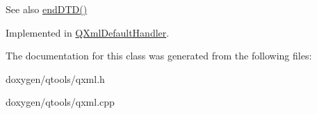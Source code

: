 \begin{DoxySeeAlso}{See also}
\mbox{\hyperlink{class_q_xml_lexical_handler_a7f5188d7a0a54b6c276c5e7e2faa72bc}{end\+D\+T\+D()}} 
\end{DoxySeeAlso}


Implemented in \mbox{\hyperlink{class_q_xml_default_handler_a998b69468c42957be5d2778cadece341}{Q\+Xml\+Default\+Handler}}.



The documentation for this class was generated from the following files\+:\begin{DoxyCompactItemize}
\item 
doxygen/qtools/qxml.\+h\item 
doxygen/qtools/qxml.\+cpp\end{DoxyCompactItemize}
